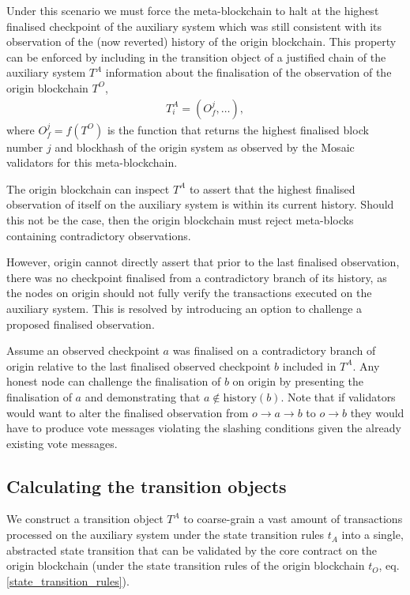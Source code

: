 \documentclass[12pt,a4paper]{article}
\begin{document}
Under this scenario we must force the meta-blockchain to halt at the highest finalised checkpoint of the auxiliary system which was still consistent with its observation of the (now reverted) history of the origin blockchain.
This property can be enforced by including in the transition object of a justified chain of the auxiliary system $T^A$ information about the finalisation of the observation of the origin blockchain $T^O$,
\begin{align*}
  T^A_i = (O^j_f, \dots),
\end{align*}
where $O^j_f = f(T^O)$ is the function that returns the highest finalised block number $j$ and blockhash of the origin system as observed by the Mosaic validators for this meta-blockchain.

The origin blockchain can inspect $T^A$ to assert that the highest finalised observation of itself on the auxiliary system is within its current history.
Should this not be the case, then the origin blockchain must reject meta-blocks containing contradictory observations.

However, origin cannot directly assert that prior to the last finalised observation, there was no checkpoint finalised from a contradictory branch of its history, as the nodes on origin should not fully verify the transactions executed on the auxiliary system.
This is resolved by introducing an option to challenge a proposed finalised observation.

Assume an observed checkpoint $a$ was finalised on a contradictory branch of origin relative to the last finalised observed checkpoint $b$ included in $T^A$.
Any honest node can challenge the finalisation of $b$ on origin by presenting the finalisation of $a$ and demonstrating that $a \notin \text{history}(b)$.
Note that if validators would want to alter the finalised observation from $o \rightarrow a \rightarrow b$ to $o \rightarrow b$ they would have to produce vote messages violating the slashing conditions given the already existing vote messages.

\subsection{Calculating the transition objects}

We construct a transition object $T^A$ to coarse-grain a vast amount of transactions processed on the auxiliary system under the state transition rules $t_A$ into a single, abstracted state transition that can be validated by the core contract on the origin blockchain (under the state transition rules of the origin blockchain $t_O$, eq. \ref{state_transition_rules}).
\end{document}

